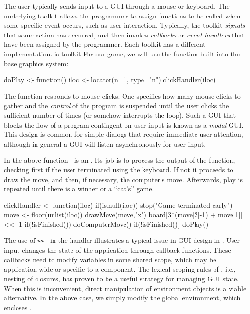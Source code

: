 The user typically sends input to a GUI through a mouse or keyboard. 
The underlying toolkit allows the programmer to assign
functions to be called when some specific event occurs, such as user interaction. Typically, the
toolkit \textit{signals} that some action has occurred, and then
invokes \textit{callbacks} or \textit{event handlers} that have been
assigned by the programmer. Each toolkit has a different implementation. is toolkit
For our game, we will use the  function built
into the base \R\/ graphics system:
\begin{Schunk}
\begin{Sinput}
 doPlay <- function() {
   iloc <- locator(n=1, type="n")
   clickHandler(iloc)
 }
\end{Sinput}
\end{Schunk}
%
The  function responds to mouse clicks. One specifies
how many mouse clicks to gather and the \textit{control} of the
program is suspended until the user clicks the sufficient number of
times (or somehow interrupts the loop). Such a GUI that blocks the
flow of a program contingent on user input is known as a
\textit{modal} GUI. This design is common for simple dialogs that
require immediate user attention, although in general a GUI will
listen asynchronously for user input.


In the above function ,  is
an . Its job is to process the output of the
 function, checking first if the user terminated
 using the keyboard. If not it proceeds to draw the
move, and then, if necessary, the computer's move. Afterwards, play is
repeated until there is a winner or a ``cat's'' game.


\begin{Schunk}
\begin{Sinput}
 clickHandler <- function(iloc) {
   if(is.null(iloc)) 
     stop("Game terminated early")
   move <- floor(unlist(iloc))
   drawMove(move,"x")
   board[3*(move[2]-1) + move[1]] <<- 1
   if(!isFinished()) 
     doComputerMove()
   if(!isFinished()) 
     doPlay()
 }
\end{Sinput}
\end{Schunk}

The use of \verb+<<-+ in the handler illustrates a typical issue in
GUI design in \R.  User input changes the state of the application
through callback functions. These callbacks need to modify variables
in some shared scope, which may be application-wide or specific to a
component. The lexical scoping rules of \R, i.e., nesting of closures,
has proven to be a useful strategy for managing GUI state. When this
is inconvenient, direct manipulation of environment objects is a
viable alternative. In the above case, we simply modify the global
environment, which encloses .

